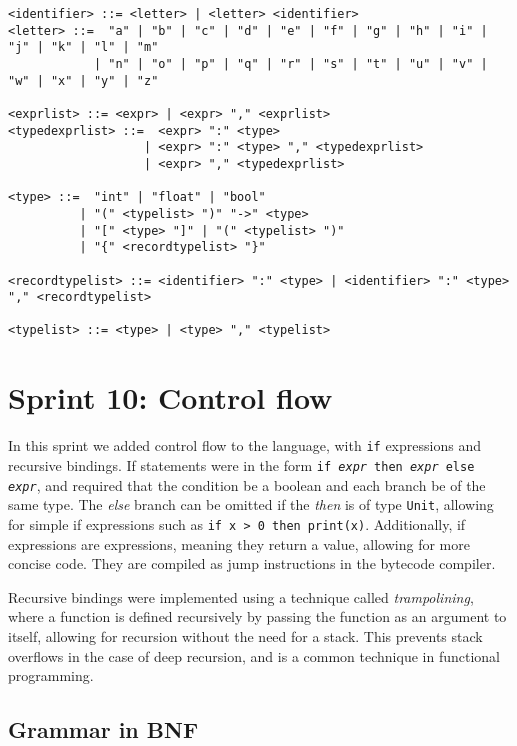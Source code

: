 \begin{verbatim}
<identifier> ::= <letter> | <letter> <identifier>
<letter> ::=  "a" | "b" | "c" | "d" | "e" | "f" | "g" | "h" | "i" | "j" | "k" | "l" | "m" 
            | "n" | "o" | "p" | "q" | "r" | "s" | "t" | "u" | "v" | "w" | "x" | "y" | "z"

<exprlist> ::= <expr> | <expr> "," <exprlist>
<typedexprlist> ::=  <expr> ":" <type> 
                   | <expr> ":" <type> "," <typedexprlist>
                   | <expr> "," <typedexprlist>
    
<type> ::=  "int" | "float" | "bool" 
          | "(" <typelist> ")" "->" <type> 
          | "[" <type> "]" | "(" <typelist> ")"
          | "{" <recordtypelist> "}"
          
<recordtypelist> ::= <identifier> ":" <type> | <identifier> ":" <type> "," <recordtypelist>

<typelist> ::= <type> | <type> "," <typelist>
\end{verbatim}

\section{Sprint 10: Control flow}\label{sec:control-flow}

In this sprint we added control flow to the language, with \texttt{if} expressions and recursive bindings.
If statements were in the form \texttt{if \textit{expr} then \textit{expr} else \textit{expr}}, and required that 
the condition be a boolean and each branch be of the same type. 
The \textit{else} branch can be omitted if the \textit{then} is of type \texttt{Unit}, allowing for simple if
expressions such as \texttt{if x > 0 then print(x)}.
Additionally, if expressions are expressions, meaning they return a value, allowing for more concise code.
They are compiled as jump instructions in the bytecode compiler.

Recursive bindings were implemented using a technique called \textit{trampolining}, where a function is defined
recursively by passing the function as an argument to itself, allowing for recursion without the need for a stack.
This prevents stack overflows in the case of deep recursion, and is a common technique in functional programming.

\subsection{Grammar in BNF}\label{subsec:grammar-in-bnf10}

